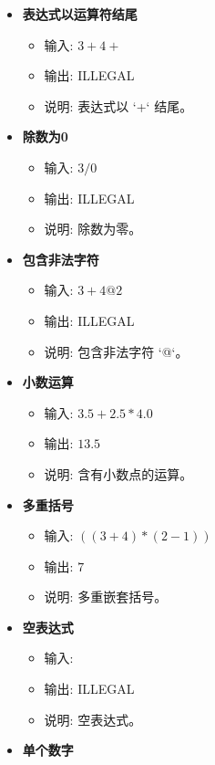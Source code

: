 \documentclass{article}
\begin{document}
\begin{itemize}
\begin{itemize}
    \end{itemize}
    \item \textbf{表达式以运算符结尾}
    \begin{itemize}
        \item 输入: \(3 + 4 +\)
        \item 输出: ILLEGAL
        \item 说明: 表达式以 `+` 结尾。
    \end{itemize}
    \item \textbf{除数为0}
    \begin{itemize}
        \item 输入: \(3 / 0\)
        \item 输出: ILLEGAL
        \item 说明: 除数为零。
    \end{itemize}
    \item \textbf{包含非法字符}
    \begin{itemize}
        \item 输入: \(3 + 4 @ 2\)
        \item 输出: ILLEGAL
        \item 说明: 包含非法字符 `@`。
    \end{itemize}
    \item \textbf{小数运算}
    \begin{itemize}
        \item 输入: \(3.5 + 2.5 * 4.0\)
        \item 输出: \(13.5\)
        \item 说明: 含有小数点的运算。
    \end{itemize}
    \item \textbf{多重括号}
    \begin{itemize}
        \item 输入: \(( ( 3 + 4 ) * ( 2 - 1 ) )\)
        \item 输出: \(7\)
        \item 说明: 多重嵌套括号。
    \end{itemize}
    \item \textbf{空表达式}
    \begin{itemize}
        \item 输入: \(\)
        \item 输出: ILLEGAL
        \item 说明: 空表达式。
    \end{itemize}
    \item \textbf{单个数字}
    \begin{itemize}

\end{itemize}
\end{itemize}
\end{document}
